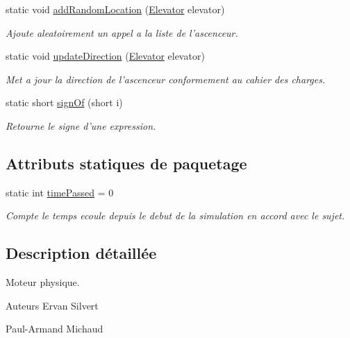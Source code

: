 \begin{DoxyCompactItemize}
static void \hyperlink{classElevatorProject_a77dc39b7be58598bdeb1ea046fba80bd}{add\-Random\-Location} (\hyperlink{classElevatorProject_1_1Elevator}{Elevator} elevator)
\begin{DoxyCompactList}\small\item\em Ajoute aleatoirement un appel a la liste de l'ascenceur. \end{DoxyCompactList}\item 
static void \hyperlink{classElevatorProject_a3fa954118cf63e69d6c949723e93f19f}{update\-Direction} (\hyperlink{classElevatorProject_1_1Elevator}{Elevator} elevator)
\begin{DoxyCompactList}\small\item\em Met a jour la direction de l'ascenceur conformement au cahier des charges. \end{DoxyCompactList}\item 
static short \hyperlink{classElevatorProject_a864982da0944af7548bda913614faa57}{sign\-Of} (short i)
\begin{DoxyCompactList}\small\item\em Retourne le signe d'une expression. \end{DoxyCompactList}\end{DoxyCompactItemize}
\subsection*{Attributs statiques de paquetage}
\begin{DoxyCompactItemize}
\item 
static int \hyperlink{classElevatorProject_ab748dd5a6fb42b4c2b83d4e6ad3138ba}{time\-Passed} = 0
\begin{DoxyCompactList}\small\item\em Compte le temps ecoule depuis le debut de la simulation en accord avec le sujet. \end{DoxyCompactList}\end{DoxyCompactItemize}


\subsection{Description détaillée}
Moteur physique. 

\begin{DoxyAuthor}{Auteurs}
Ervan Silvert 

Paul-\/\-Armand Michaud 
\end{DoxyAuthor}


